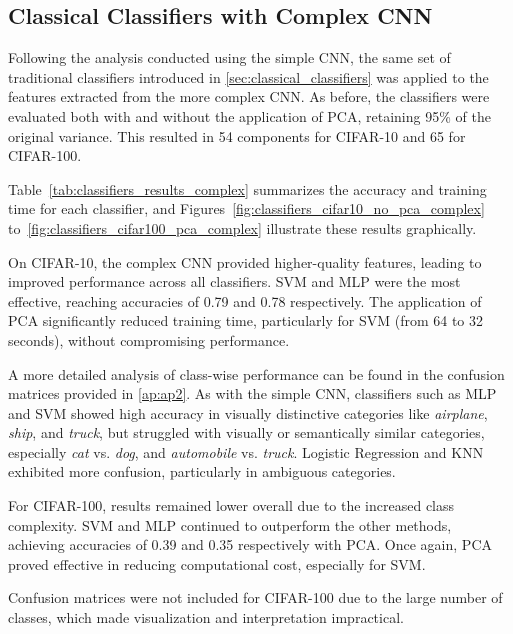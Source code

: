 \documentclass[journal,article,submit,pdftex,moreauthors]{Definitions/mdpi}
\begin{document}
\subsection{Classical Classifiers with Complex CNN}
\label{sec:classical_classifiers_2}

Following the analysis conducted using the simple CNN, the same set of traditional classifiers introduced in \autoref{sec:classical_classifiers} was applied to the features extracted from the more complex CNN. As before, the classifiers were evaluated both with and without the application of PCA, retaining 95\% of the original variance. This resulted in 54 components for CIFAR-10 and 65 for CIFAR-100.

Table~\ref{tab:classifiers_results_complex} summarizes the accuracy and training time for each classifier, and Figures~\ref{fig:classifiers_cifar10_no_pca_complex} to~\ref{fig:classifiers_cifar100_pca_complex} illustrate these results graphically.

On CIFAR-10, the complex CNN provided higher-quality features, leading to improved performance across all classifiers. SVM and MLP were the most effective, reaching accuracies of 0.79 and 0.78 respectively. The application of PCA significantly reduced training time, particularly for SVM (from 64 to 32 seconds), without compromising performance.

A more detailed analysis of class-wise performance can be found in the confusion matrices provided in \autoref{ap:ap2}. As with the simple CNN, classifiers such as MLP and SVM showed high accuracy in visually distinctive categories like \textit{airplane}, \textit{ship}, and \textit{truck}, but struggled with visually or semantically similar categories, especially \textit{cat} vs. \textit{dog}, and \textit{automobile} vs. \textit{truck}. Logistic Regression and KNN exhibited more confusion, particularly in ambiguous categories.

For CIFAR-100, results remained lower overall due to the increased class complexity. SVM and MLP continued to outperform the other methods, achieving accuracies of 0.39 and 0.35 respectively with PCA. Once again, PCA proved effective in reducing computational cost, especially for SVM.

Confusion matrices were not included for CIFAR-100 due to the large number of classes, which made visualization and interpretation impractical.
\end{document}
